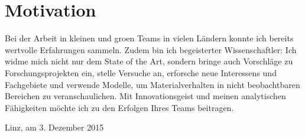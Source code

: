 \documentclass[11pt,a4paper,sans]{moderncv}
\begin{document}
\section{Motivation}

% 

Bei der Arbeit in kleinen und gro{\upshape{\ss}}en Teams in vielen 
L\"{a}ndern konnte ich bereits wertvolle Erfahrungen sammeln. 
Zudem bin ich begeisterter Wissenschaftler: Ich widme mich nicht nur dem State of the Art, 
sondern bringe auch Vorschl\"{a}ge zu Forschungsprojekten ein, stelle Versuche an,
erforsche neue Interessens und Fachgebiete und verwende Modelle, um
Materialverhalten in nicht beobachtbaren Bereichen zu veranschaulichen.
Mit Innovationsgeist und meinen analytischen F\"{a}higkeiten m\"{o}chte ich zu den Erfolgen Ihres Teams beitragen. \\

 \cvline{}{}{}

Linz, am 3. Dezember 2015
\end{document}

